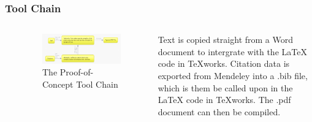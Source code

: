 \documentclass[aspectratio = 169]{beamer}
\begin{document}
\begin{frame}
\label{toolchain}
\frametitle{Tool Chain}
\begin{columns}


\hyperlink{introI}{} \newline
\hyperlink{introII}{} \newline 
\hyperlink{scoping}{} \newline
\hyperlink{elaboration}{} \newline  
\hyperlink{software}{} \newline 
\hyperlink{toolchain}{} \newline 
\hyperlink{learning}{} \newline 
\hyperlink{problems}{} \newline 
\hyperlink{results}{} \newline
\hyperlink{exampleI}{} \newline 
\hyperlink{exampleII}{}  


\begin{figure}
\includegraphics[scale = 0.45]{toolchain}
\caption{The Proof-of-Concept Tool Chain}
\end{figure}
Text is copied straight from a Word document to intergrate with the LaTeX code in TeXworks. Citation data is exported from Mendeley into a .bib file, which is them be called upon in the LaTeX code in TeXworks. The .pdf document can then be compiled.
\end{columns}
\end{frame}



\end{document}
